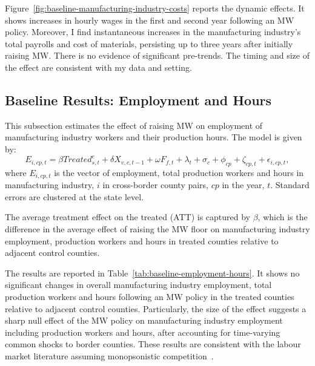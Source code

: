 \documentclass{C:/Users/david/OneDrive/Documents/ULMS/PhD/Thesis/chapter3/src/climate_change/latex/Economic_Journal/OUP-EJ}
\begin{document}
    Figure~\ref{fig:baseline-manufacturing-industry-costs} reports the dynamic effects. It shows increases in hourly wages in the first and second year following an MW policy. Moreover, I find instantaneous increases in the manufacturing industry's total payrolls and cost of materials, persisting up to three years after initially raising MW. There is no evidence of significant pre-trends. The timing and size of the effect are consistent with my data and setting.

    \subsection{Baseline Results: Employment and Hours}\label{subsec:baseline-results-employment-and-hours}
    This subsection estimates the effect of raising MW on employment of manufacturing industry workers and their production hours. The model is given by:
    \begin{equation}
        E_{i,cp,t} = \beta Treated_{s,t}^e + \delta X_{v,c,t-1} + \omega F_{f,t} + \lambda_{t} + \sigma_{c} + \phi_{cp} + \zeta_{cp,t} + \epsilon_{i,cp,t},\label{eq:baseline-emp-hours}
    \end{equation}
    where $E_{i,cp,t}$ is the vector of employment, total production workers and hours in manufacturing industry, $i$ in cross-border county pairs, $cp$ in the year, $t$. Standard errors are clustered at the state level.
    

    The average treatment effect on the treated (ATT) is captured by $\beta$, which is the difference in the average effect of raising the MW floor on manufacturing industry employment, production workers and hours in treated counties relative to adjacent control counties.

    The results are reported in Table~\ref{tab:baseline-employment-hours}. It shows no significant changes in overall manufacturing industry employment, total production workers and hours following an MW policy in the treated counties relative to adjacent control counties. Particularly, the size of the effect suggests a sharp null effect of the MW policy on manufacturing industry employment including production workers and hours, after accounting for time-varying common shocks to border counties. These results are consistent with the labour market literature assuming monopsonistic competition~\citep{card2000minimum, aaronson2018industry, cengiz2019effect, wong2019minimum, dustmann2022reallocation}.
\end{document}
